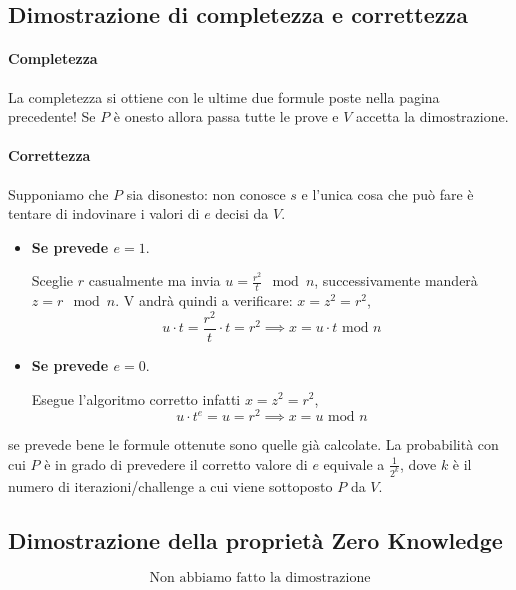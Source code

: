 \subsection{Dimostrazione di completezza e correttezza}
\paragraph{Completezza} La completezza si ottiene con le ultime due formule poste nella pagina precedente! Se $P$ è onesto allora passa tutte le prove e $V$ accetta la dimostrazione.
\paragraph{Correttezza} Supponiamo che $P$ sia disonesto: non conosce $s$ e l'unica cosa che può fare è tentare di indovinare i valori di $e$ decisi da $V$.
\begin{itemize}
    \item \textbf{Se prevede $e = 1$}.
    
    Sceglie $r$ casualmente ma invia $u = \frac{r^2}{t} \mod n$, successivamente manderà\\ $z = r \mod n$. V andrà quindi a verificare: $x = z^2 = r^2$, $$u \cdot t = \frac{r^2}{t} \cdot t = r^2 \implies x = u \cdot t \text{ mod } n$$
    \item \textbf{Se prevede $e = 0$}.
    
    Esegue l'algoritmo corretto infatti $x = z^2 = r^2$, $$u \cdot t^e = u = r^2 \implies x = u \text{ mod } n$$
\end{itemize}
se prevede bene le formule ottenute sono quelle già calcolate. La probabilità con cui $P$ è in grado di prevedere il corretto valore di $e$ equivale a $\frac{1}{2^k}$, dove $k$ è il numero di iterazioni/challenge a cui viene sottoposto $P$ da $V$.

\subsection{Dimostrazione della proprietà Zero Knowledge}
\[\boxed{\text{Non abbiamo fatto la dimostrazione}}\]

